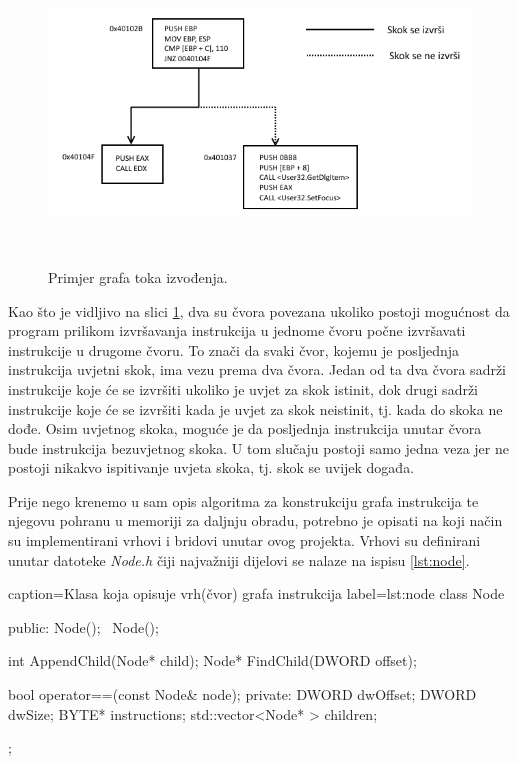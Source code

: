 \documentclass[times, utf8, diplomski, numeric]{fer}
\begin{document}
\begin{figure}[!htb]
\centering
\setlength\fboxsep{0pt}
\setlength\fboxrule{0.5pt}
\includegraphics[width=13cm, height=8cm]{slike/control_flow_graph}
\caption{Primjer grafa toka izvođenja.}
\label{fig:control_flow_graph} 
\end{figure}

Kao što je vidljivo na slici \ref{fig:control_flow_graph}, dva su čvora
povezana ukoliko postoji mogućnost da program prilikom izvršavanja instrukcija
u jednome čvoru počne izvršavati instrukcije u drugome čvoru. To znači da svaki
čvor, kojemu je posljednja instrukcija uvjetni skok, ima vezu prema dva čvora.
Jedan od ta dva čvora sadrži instrukcije koje će se izvršiti ukoliko je uvjet
za skok istinit, dok drugi sadrži instrukcije koje će se izvršiti kada je uvjet
za skok neistinit, tj. kada do skoka ne dođe. Osim uvjetnog skoka, moguće je da
posljednja instrukcija unutar čvora bude instrukcija bezuvjetnog skoka. U tom
slučaju postoji samo jedna veza jer ne postoji nikakvo ispitivanje uvjeta
skoka, tj. skok se uvijek događa.

Prije nego krenemo u sam opis algoritma za konstrukciju grafa instrukcija te
njegovu pohranu u memoriji za daljnju obradu, potrebno je opisati na koji način
su implementirani vrhovi i bridovi unutar ovog projekta. Vrhovi su definirani
unutar datoteke \emph{Node.h} čiji najvažniji dijelovi se nalaze na ispisu 
\ref{lst:node}. 

\begin{ispis} {caption=Klasa koja opisuje vrh(čvor) grafa instrukcija} {label=lst:node}
class Node
{
public:
	Node();
	~Node();

	int AppendChild(Node* child);
	Node* FindChild(DWORD offset);

	bool operator==(const Node& node);
private:
	DWORD dwOffset;
	DWORD dwSize;
	BYTE* instructions;
	std::vector<Node* > children;
};
\end{ispis}
\end{document}
